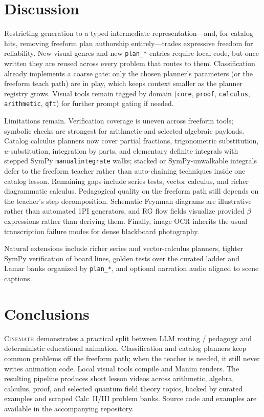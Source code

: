 \documentclass[11pt]{article}
\begin{document}
\section{Discussion}

Restricting generation to a typed intermediate representation---and, for
catalog hits, removing freeform plan authorship entirely---trades expressive
freedom for reliability. New visual genres and new \texttt{plan\_*} entries
require local code, but once written they are reused across every problem that
routes to them. Classification already implements a coarse gate: only the
chosen planner's parameters (or the freeform teach path) are in play, which
keeps context smaller as the planner registry grows. Visual tools remain tagged
by domain (\texttt{core}, \texttt{proof}, \texttt{calculus},
\texttt{arithmetic}, \texttt{qft}) for further prompt gating if needed.

Limitations remain. Verification coverage is uneven across freeform tools;
symbolic checks are strongest for arithmetic and selected algebraic payloads.
Catalog calculus planners now cover partial fractions, trigonometric
substitution, $u$-substitution, integration by parts, and elementary definite
integrals with stepped SymPy \texttt{manualintegrate} walks; stacked or
SymPy-unwalkable integrals defer to the freeform teacher rather than
auto-chaining techniques inside one catalog lesson. Remaining gaps include
series tests, vector calculus, and richer diagrammatic calculus. Pedagogical
quality on the freeform path still depends on the teacher's step
decomposition. Schematic Feynman diagrams are illustrative rather than
automated 1PI generators, and RG flow fields visualize provided $\beta$
expressions rather than deriving them. Finally, image OCR inherits the usual
transcription failure modes for dense blackboard photography.

Natural extensions include richer series and vector-calculus planners,
tighter SymPy verification of board lines, golden tests over the curated
ladder and Lamar banks organized by \texttt{plan\_*}, and optional narration
audio aligned to scene captions.

\section{Conclusions}

\textsc{Cinemath} demonstrates a practical split between LLM routing /
pedagogy and deterministic educational animation. Classification and catalog
planners keep common problems off the freeform path; when the teacher is
needed, it still never writes animation code. Local visual tools compile and
Manim renders. The resulting pipeline produces short lesson videos across
arithmetic, algebra, calculus, proof, and selected quantum field theory
topics, backed by curated examples and scraped Calc~II/III problem banks.
Source code and examples are available in the accompanying repository.
\end{document}
